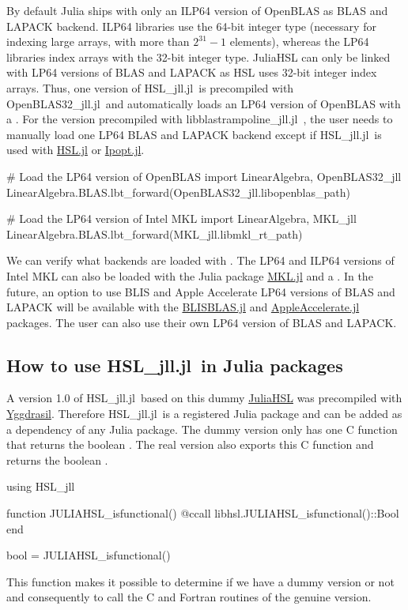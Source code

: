 \documentclass[gdweb]{geradwp}
\newcommand{\HSLjll}{HSL\_jll.jl}
\newcommand{\LBTjll}{libblastrampoline\_jll.jl}
\newcommand{\OpenBLASjll}{OpenBLAS32\_jll.jl}
\begin{document}
By default Julia ships with only an ILP64 version of OpenBLAS as BLAS and LAPACK backend.
ILP64 libraries use the 64-bit integer type (necessary for indexing large arrays, with more than $2^{31}-1$ elements), whereas the LP64 libraries index arrays with the 32-bit integer type.
JuliaHSL can only be linked with LP64 versions of BLAS and LAPACK as HSL uses 32-bit integer index arrays.
Thus, one version of \HSLjll~is precompiled with \OpenBLASjll~and automatically loads an LP64 version of OpenBLAS with a .
For the version precompiled with \LBTjll~, the user needs to manually load one LP64 BLAS and LAPACK backend except if \HSLjll~is used with \href{https://github.com/JuliaSmoothOptimizers/HSL.jl}{HSL.jl} or \href{https://github.com/jump-dev/Ipopt.jl}{Ipopt.jl}.
\begin{jllisting}
# Load the LP64 version of OpenBLAS
import LinearAlgebra, OpenBLAS32_jll
LinearAlgebra.BLAS.lbt_forward(OpenBLAS32_jll.libopenblas_path)

# Load the LP64 version of Intel MKL
import LinearAlgebra, MKL_jll
LinearAlgebra.BLAS.lbt_forward(MKL_jll.libmkl_rt_path)
\end{jllisting}
We can verify what backends are loaded with .
The LP64 and ILP64 versions of Intel MKL can also be loaded with the Julia package \href{https://github.com/JuliaLinearAlgebra/MKL.jl}{MKL.jl} and a .
In the future, an option to use BLIS and Apple Accelerate LP64 versions of BLAS and LAPACK will be available with the \href{https://github.com/JuliaLinearAlgebra/BLISBLAS.jl}{BLISBLAS.jl} and \href{https://github.com/JuliaMath/AppleAccelerate.jl}{AppleAccelerate.jl} packages.
The user can also use their own LP64 version of BLAS and LAPACK.

\subsection{How to use \HSLjll~in Julia packages}

A version 1.0 of \HSLjll~based on this dummy \href{https://github.com/ralna/JuliaHSL}{JuliaHSL} was precompiled with \href{https://github.com/JuliaPackaging/Yggdrasil}{Yggdrasil}.
Therefore \HSLjll~is a registered Julia package and can be added as a dependency of any Julia package.
The dummy version only has one C function  that returns the boolean .
The real version also exports this C function and returns the boolean .
\begin{jllisting}
using HSL_jll

function JULIAHSL_isfunctional()
    @ccall libhsl.JULIAHSL_isfunctional()::Bool
end

bool = JULIAHSL_isfunctional()
\end{jllisting}
This function makes it possible to determine if we have a dummy version or not and consequently to call the C and Fortran routines of the genuine version.
\end{document}
